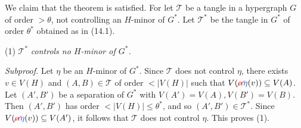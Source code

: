 We claim that the theorem is satisfied. For let $\mathscr{T}$ be a tangle in a hypergraph $G$ of order $> \theta$, not controlling an $H$-minor of $G^*$. Let $\mathscr{T}^*$ be the tangle in $G^*$ of order $\theta^*$ obtained as in (14.1).

\hspace*{12pt}(1) $\mathscr{T}^*$ \textit{controls no $H$-minor of $G^*$.}

\textit{Subproof.} Let $\eta$ be an $H$-minor of $G^*$. Since $\mathscr{T}$ does not control $\eta$, there exists $v \in V(H)$ and $(A, B) \in \mathscr{T}$ of order $< |V(H)|$ such that $V(\delm{\alpha}\fix{\eta}(v)) \subseteq V(A)$. Let $(A', B')$ be a separation of $G^*$ with $V(A') = V(A), V(B') = V(B)$. Then $(A', B')$ has order $< |V(H)| \le \theta^*$, and so $(A', B') \in \mathscr{T}^*$. Since $V(\delm{\alpha}\fix{\eta}(v)) \subseteq V(A')$, it follows that $\mathscr{T}$ does not control $\eta$. This proves (1).
